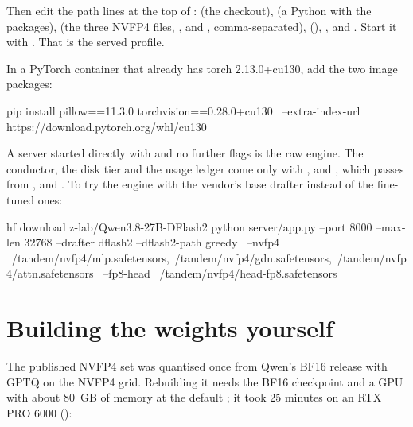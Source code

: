 Then edit the path lines at the top of :  (the checkout),  (a Python with the packages),  (the three NVFP4 files, ,  and , comma-separated),  (), ,  and . Start it with . That is the served profile.

In a PyTorch container that already has torch 2.13.0+cu130, add the two image packages:

\begin{shell}
pip install pillow==11.3.0 torchvision==0.28.0+cu130 \
    --extra-index-url https://download.pytorch.org/whl/cu130
\end{shell}

A server started directly with  and no further flags is the raw engine. The conductor, the disk tier and the usage ledger come only with ,  and , which  passes from ,  and . To try the engine with the vendor's base drafter instead of the fine-tuned ones:

\begin{shell}
hf download z-lab/Qwen3.8-27B-DFlash2
python server/app.py --port 8000 --max-len 32768 --drafter dflash2 --dflash2-path greedy \
    --nvfp4 ~/tandem/nvfp4/mlp.safetensors,~/tandem/nvfp4/gdn.safetensors,~/tandem/nvfp4/attn.safetensors \
    --fp8-head ~/tandem/nvfp4/head-fp8.safetensors
\end{shell}

\section{Building the weights yourself}

The published NVFP4 set was quantised once from Qwen's BF16 release with GPTQ on the NVFP4 grid. Rebuilding it needs the BF16 checkpoint and a GPU with about 80~GB of memory at the default ; it took 25 minutes on an RTX PRO 6000 (\measured):

